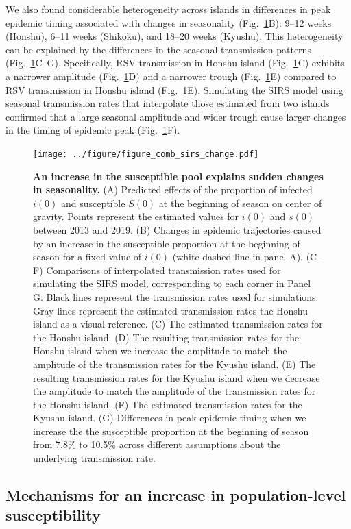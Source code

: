 \documentclass[12pt]{article}
\newcommand{\fref}[1]{Fig.~\ref{fig:#1}}
\begin{document}
We also found considerable heterogeneity across islands in differences in peak epidemic timing associated with changes in seasonality (\fref{fig3}B): 9--12 weeks (Honshu), 6--11 weeks (Shikoku), and 18--20 weeks (Kyushu).
This heterogeneity can be explained by the differences in the seasonal transmission patterns (\fref{fig3}C--G).
Specifically, RSV transmission in Honshu island (\fref{fig3}C) exhibits a narrower amplitude (\fref{fig3}D) and a narrower trough (\fref{fig3}E) compared to RSV transmission in Honshu island (\fref{fig3}E).
Simulating the SIRS model using seasonal transmission rates that interpolate those estimated from two islands confirmed that a large seasonal amplitude and wider trough cause larger changes in the timing of epidemic peak (\fref{fig3}F). 

\begin{figure}[!th]
\texttt{[image: ../figure/figure\_comb\_sirs\_change.pdf]}
\caption{
\textbf{An increase in the susceptible pool explains sudden changes in seasonality.}
(A) Predicted effects of the proportion of infected $i(0)$ and susceptible $S(0)$ at the beginning of season on center of gravity.
Points represent the estimated values for $i(0)$ and $s(0)$ between 2013 and 2019.
(B) Changes in epidemic trajectories caused by an increase in the susceptible proportion at the beginning of season for a fixed value of $i(0)$ (white dashed line in panel A).
(C--F) Comparisons of interpolated transmission rates used for simulating the SIRS model, corresponding to each corner in Panel G. 
Black lines represent the transmission rates used for simulations. 
Gray lines represent the estimated transmission rates the Honshu island as a visual reference.
(C) The estimated transmission rates for the Honshu island.
(D) The resulting transmission rates for the Honshu island when we increase the amplitude to match the amplitude of the transmission rates for the Kyushu island.
(E) The resulting transmission rates for the Kyushu island when we decrease the amplitude to match the amplitude of the transmission rates for the Honshu island.
(F) The estimated transmission rates for the Kyushu island.
(G) Differences in peak epidemic timing when we increase the the susceptible proportion at the beginning of season from 7.8\% to 10.5\% across different assumptions about the underlying transmission rate. 
}
\label{fig:fig3}
\end{figure}

\subsection*{Mechanisms for an increase in population-level susceptibility}
\end{document}
